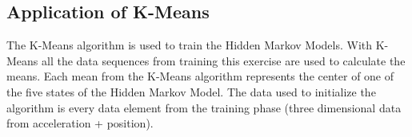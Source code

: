 \subsection{Application of K-Means}
The K-Means algorithm is used to train the Hidden Markov Models. With K-Means all the data sequences from training this exercise are used to calculate the means. Each mean from the K-Means algorithm represents the center of one of the five states of the Hidden Markov Model. The data used to initialize the algorithm is every data element from the training phase (three dimensional data from acceleration + position).